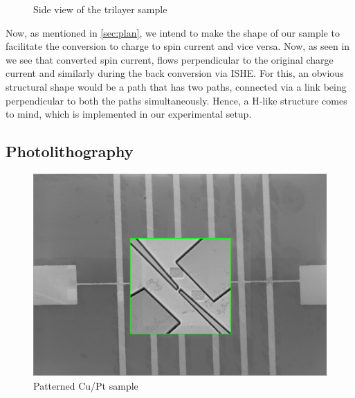 \begin{figure}
    \centering
{}
    \caption{Side view of the trilayer sample}
    \label{layers}
\end{figure}

Now, as mentioned in \cref{sec:plan}, we intend to make the shape of our sample to facilitate the conversion to charge to spin current and vice versa.
Now, as seen in %
we see that converted spin current, flows perpendicular to the original charge current and similarly during the back conversion via ISHE.
For this, an obvious structural shape would be a path that has two paths, connected via a link being perpendicular to both the paths simultaneously.
Hence, a \textsc{H}-like structure comes to mind, which is implemented in our experimental setup.

\subsection{Photolithography}

\begin{figure}[h!]
    \includegraphics[width=\columnwidth]{newtrack.png}
    \caption{Patterned Cu/Pt sample}
\end{figure}

